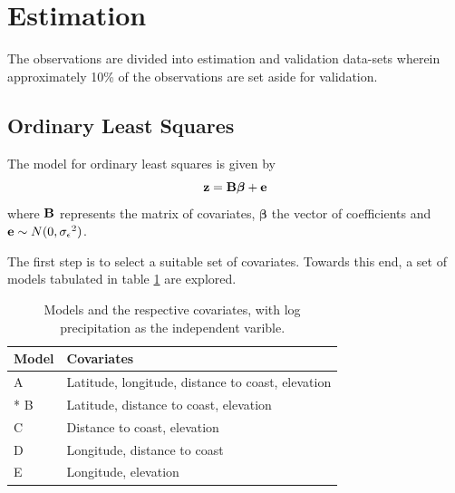 \documentclass[a4paper,10pt]{article}
\def\bB{{\bf B}}
\def\be{{\bf e}}
\def\bz{{\bf z}}
\def\bbeta{{\boldsymbol \beta}}
\def\sigmaeps{{\sigma_{\epsilon}}}
\begin{document}
\section{Estimation}
The observations are divided into estimation and validation data-sets wherein approximately 10\% of the observations are set aside for validation.
\subsection{Ordinary Least Squares}
The model for ordinary least squares is given by
\begin{equation*}
 \bz = \bB \bbeta + \be
\end{equation*}
where $\bB$ represents the matrix of covariates, $\bbeta$ the vector of coefficients and $\be \sim N(0,\sigmaeps^2)$.

The first step is to select a suitable set of covariates. Towards this end, a set of models tabulated in table \ref{tab:models} are explored.
\begin{table}[H]
\centering
\begin{tabular}{lp{9cm}}
\hline
{\bf Model} & {\bf Covariates} \\
\hline
 A & Latitude, longitude, distance to coast, elevation\\
 * B & Latitude, distance to coast, elevation\\
 C & Distance to coast, elevation\\
 D & Longitude, distance to coast\\
 E & Longitude, elevation\\
\hline
\end{tabular}
\caption{Models and the respective covariates, with log precipitation as the independent varible.}
\label{tab:models}
\end{table}
\end{document}
